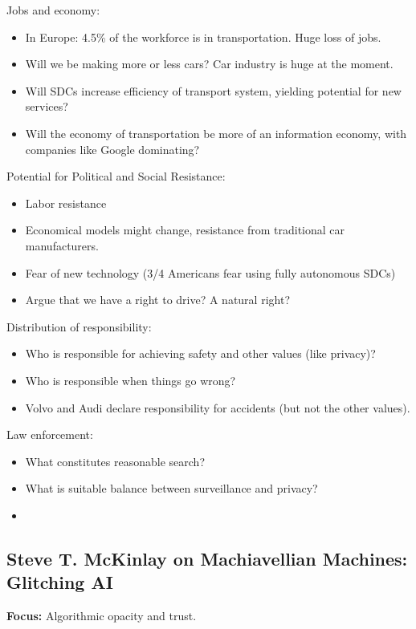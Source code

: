Jobs and economy:
\begin{itemize}
    \item In Europe: 4.5\% of the workforce is in transportation. Huge loss of jobs.
    \item Will we be making more or less cars? Car industry is huge at the moment.
    \item Will SDCs increase efficiency of transport system, yielding potential for new services?
    \item Will the economy of transportation be more of an information economy, with companies like Google dominating?
\end{itemize}

Potential for Political and Social Resistance:
\begin{itemize}
    \item Labor resistance
    \item Economical models might change, resistance from traditional car manufacturers.
    \item Fear of new technology (3/4 Americans fear using fully autonomous SDCs)
    \item Argue that we have a right to drive? A natural right?
\end{itemize}

Distribution of responsibility:
\begin{itemize}
    \item Who is responsible for achieving safety and other values (like privacy)?
    \item Who is responsible when things go wrong?
    \item Volvo and Audi declare responsibility for accidents (but not the other values).
\end{itemize}

Law enforcement:
\begin{itemize}
    \item What constitutes reasonable search?
    \item What is suitable balance between surveillance and privacy?
    \item 
\end{itemize}


\subsection{Steve T. McKinlay on Machiavellian Machines: Glitching AI}

{\bf Focus:} Algorithmic opacity and trust. \\

